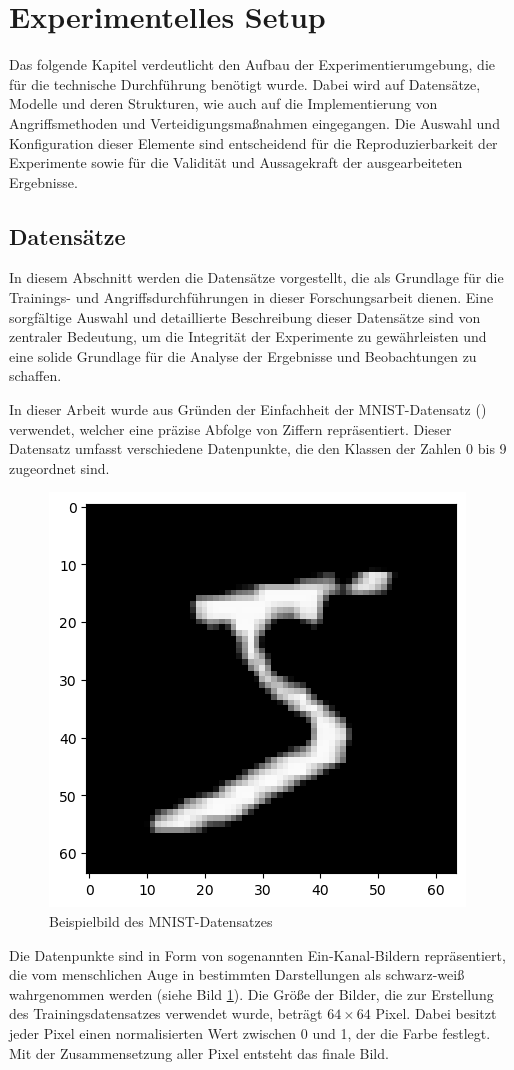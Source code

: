 \section{Experimentelles Setup}
Das folgende Kapitel verdeutlicht den Aufbau der Experimentierumgebung, die für die technische Durchführung benötigt wurde. Dabei wird auf Datensätze, Modelle und deren Strukturen, wie auch auf die Implementierung von Angriffsmethoden und Verteidigungsmaßnahmen eingegangen. Die Auswahl und Konfiguration dieser Elemente sind entscheidend für die Reproduzierbarkeit der Experimente sowie für die Validität und Aussagekraft der ausgearbeiteten Ergebnisse.
\subsection{Datensätze}\label{subsection:datensaetze}
In diesem Abschnitt werden die Datensätze vorgestellt, die als Grundlage für die Trainings- und Angriffsdurchführungen in dieser Forschungsarbeit dienen. Eine sorgfältige Auswahl und detaillierte Beschreibung dieser Datensätze sind von zentraler Bedeutung, um die Integrität der Experimente zu gewährleisten und eine solide Grundlage für die Analyse der Ergebnisse und Beobachtungen zu schaffen.

In dieser Arbeit wurde aus Gründen der Einfachheit der MNIST-Datensatz (\cite{noauthor_mnist_nodate}) verwendet, welcher eine präzise Abfolge von Ziffern repräsentiert. Dieser Datensatz umfasst verschiedene Datenpunkte, die den Klassen der Zahlen 0 bis 9 zugeordnet sind. 

\begin{figure}[H]
	\centering
	\includegraphics[width=0.2\linewidth]{Bilder/5_mnist.png}
	\caption{Beispielbild des MNIST-Datensatzes}
	\label{img:mnist}
\end{figure}

Die Datenpunkte sind in Form von sogenannten Ein-Kanal-Bildern repräsentiert, die vom menschlichen Auge in bestimmten Darstellungen als schwarz-weiß wahrgenommen werden (siehe Bild \ref{img:mnist}). Die Größe der Bilder, die zur Erstellung des Trainingsdatensatzes verwendet wurde, beträgt $64 \times 64$ Pixel. Dabei besitzt jeder Pixel einen normalisierten Wert zwischen 0 und 1, der die \glqq Farbe\grqq{} festlegt. Mit der Zusammensetzung aller Pixel entsteht das finale Bild.

